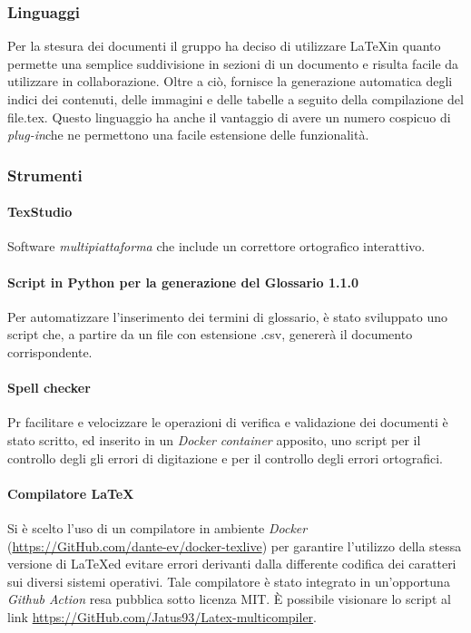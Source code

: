 \subsubsection{Linguaggi}
Per la stesura dei documenti il gruppo ha deciso di utilizzare \LaTeX \space in quanto permette una semplice suddivisione in sezioni di un documento e risulta facile da utilizzare in collaborazione. Oltre a ciò, fornisce la generazione automatica degli indici dei contenuti, delle immagini e delle tabelle a seguito della compilazione del file.tex. Questo linguaggio ha anche il vantaggio di avere un numero cospicuo di \textit{plug-in}\glo che ne permettono una facile estensione delle funzionalità.

\subsubsection{Strumenti}
\paragraph{TexStudio}
Software \textit{multipiattaforma\glo} che include un correttore ortografico interattivo.

\paragraph{Script in Python per la generazione del Glossario 1.1.0\docs}
Per automatizzare l'inserimento dei termini di glossario, è stato sviluppato uno script che, a partire da un file con estensione .csv, genererà il documento corrispondente.

\paragraph{Spell checker}
Pr facilitare e velocizzare le operazioni di verifica e validazione dei documenti è
stato scritto, ed inserito in un \textit{Docker\glo} \textit{container\glo} apposito, uno script per il controllo degli gli errori di digitazione e per il controllo degli errori ortografici.

\paragraph{Compilatore \LaTeX}
Si è scelto l'uso di un compilatore in ambiente\textit{ Docker\glo} (\url{https://GitHub.com/dante-ev/docker-texlive}) per garantire l'utilizzo della stessa versione di \LaTeX \space ed evitare errori derivanti dalla differente codifica dei caratteri sui diversi sistemi operativi. Tale compilatore è stato integrato in un'opportuna \textit{Github Action\glo} resa pubblica sotto licenza MIT. È possibile visionare lo script al link \url{https://GitHub.com/Jatus93/Latex-multicompiler}.


